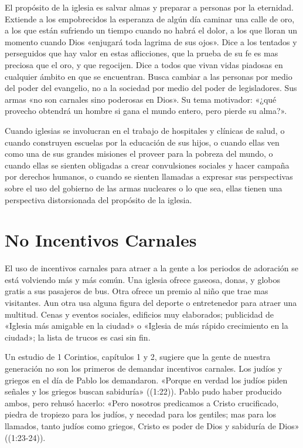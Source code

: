 \documentclass[12pt, twoside, openright]{book}
\begin{document}
El propósito de la iglesia es salvar almas y preparar a personas por la eternidad. Extiende a los empobrecidos la esperanza de algún día caminar una calle de oro, a los que están sufriendo un tiempo cuando no habrá el dolor, a los que lloran un momento cuando Dios «enjugará toda lagrima de sus ojos». Dice a los tentados y perseguidos que hay valor en estas aflicciones, que la prueba de su fe es mas preciosa que el oro, y que regocijen. Dice a todos que vivan vidas piadosas en cualquier ámbito en que se encuentran. Busca cambiar a las personas por medio del poder del evangelio, no a la sociedad por medio del poder de legisladores. Sus armas «no son carnales sino poderosas en Dios». Su tema motivador: «¿qué provecho obtendrá un hombre si gana el mundo entero, pero pierde su alma?».

Cuando iglesias se involucran en el trabajo de hospitales y clínicas de salud, o cuando construyen escuelas por la educación de sus hijos, o cuando ellas ven como una de sus grandes misiones el proveer para la pobreza del mundo, o cuando ellas se sienten obligadas a crear convulsiones sociales y hacer campaña por derechos humanos, o cuando se sienten llamadas a expresar sus perspectivas sobre el uso del gobierno de las armas nucleares o lo que sea, ellas tienen una perspectiva distorsionada del propósito de la iglesia. 

\section{No Incentivos Carnales}
El uso de incentivos carnales para atraer a la gente a los periodos de adoración se está volviendo más y más común. Una iglesia ofrece gaseosa, donas, y globos gratis a sus pasajeros de bus. Otra ofrece un premio al niño que trae mas visitantes. Aun otra usa alguna figura del deporte o entretenedor para atraer una multitud. Cenas y eventos sociales, edificios muy elaborados; publicidad de «Iglesia más amigable en la ciudad» o «Iglesia de más rápido crecimiento en la ciudad»; la lista de trucos es casi sin fin. 

Un estudio de 1 Corintios, capítulos 1 y 2, sugiere que la gente de nuestra generación no son los primeros de demandar incentivos carnales. Los judíos y griegos en el día de Pablo los demandaron. «Porque en verdad los judíos piden señales y los griegos buscan sabiduría» ((1:22)). Pablo pudo haber producido ambos, pero rehusó hacerlo: «Pero nosotros predicamos a Cristo crucificado, piedra de tropiezo para los judíos, y necedad para los gentiles; mas para los llamados, tanto judíos como griegos, Cristo es poder de Dios y sabiduría de Dios» ((1:23-24)).
\end{document}
